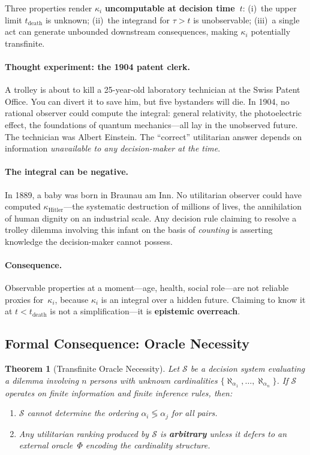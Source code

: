 \documentclass[11pt]{article}
\newtheorem{theorem}{Theorem}
\begin{document}
Three properties render $\kappa_i$ \textbf{uncomputable at decision
time~$t$}: (i)~the upper limit $t_{\mathrm{death}}$ is unknown;
(ii)~the integrand for $\tau > t$ is unobservable; (iii)~a single
act can generate unbounded downstream consequences, making $\kappa_i$
potentially transfinite.

\paragraph{Thought experiment: the 1904 patent clerk.}
A trolley is about to kill a 25-year-old laboratory technician at the
Swiss Patent Office. You can divert it to save him, but five
bystanders will die. In 1904, no rational observer could compute the
integral: general relativity, the photoelectric effect, the
foundations of quantum mechanics---all lay in the unobserved future.
The technician was Albert Einstein. The ``correct'' utilitarian answer
depends on information \emph{unavailable to any decision-maker at
the time}.

\paragraph{The integral can be negative.}
In 1889, a baby was born in Braunau am Inn. No utilitarian observer
could have computed $\kappa_{\text{Hitler}}$---the systematic
destruction of millions of lives, the annihilation of human dignity
on an industrial scale. Any decision rule claiming to resolve a
trolley dilemma involving this infant on the basis of \emph{counting}
is asserting knowledge the decision-maker cannot possess.

\paragraph{Consequence.}
Observable properties at a moment---age, health, social role---are
not reliable proxies for~$\kappa_i$, because $\kappa_i$ is an
integral over a hidden future. Claiming to know it at
$t < t_{\mathrm{death}}$ is not a simplification---it is
\textbf{epistemic overreach}.

\subsection{Formal Consequence: Oracle Necessity}

\begin{theorem}[Transfinite Oracle Necessity]
\label{thm:transfinite-oracle}
Let $\mathcal{S}$ be a decision system evaluating a dilemma involving $n$
persons with unknown cardinalities
$\{\aleph_{\alpha_1},\ldots,\aleph_{\alpha_n}\}$. If $\mathcal{S}$ operates
on finite information and finite inference rules, then:
\begin{enumerate}
    \item $\mathcal{S}$ cannot determine the ordering
          $\alpha_i \lessgtr \alpha_j$ for all pairs.
    \item Any utilitarian ranking produced by $\mathcal{S}$ is
          \textbf{arbitrary} unless it defers to an external oracle~$\Phi$
          encoding the cardinality structure.
\end{enumerate}
\end{theorem}
\end{document}
